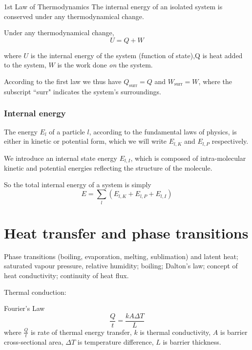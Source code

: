 \begin{thrm}{1st Law of Thermodynamics}{}
The internal energy of an isolated system is conserved under any thermodynamical change.

Under any thermodynamical change,
\begin{equation}
U = Q + W
\end{equation}
\end{thrm}

where $U$ is the internal energy of the system (function of state),$ $Q is heat added to the system, $W$ is the work done \emph{on} the system.

According to the first law we thus have $Q_\text{surr} = Q$ and $W_\text{surr} = W$, where the subscript ``surr" indicates the system’s surroundings.

\subsection{Internal energy}
The energy $E_l$ of a particle $l$, according to the fundamental laws of physics, is either in kinetic or potential form, which we will write $E_{l,K}$ and $E_{l,P}$ respectively. 

We introduce an internal state energy $E_{l,I}$, which is composed of intra-molecular kinetic and potential energies reflecting the structure of the molecule.

So the total internal energy of a system is simply
\[ E = \sum_l (E_{l,K} + E_{l,P} + E_{l,I}) \]

\pagebreak

\chapter{Heat transfer and phase transitions}
Phase transitions (boiling, evaporation, melting, sublimation) and latent heat; saturated vapour pressure, relative humidity; boiling; Dalton’s law; concept of heat conductivity; continuity of heat flux.

Thermal conduction:
\begin{thrm}{Fourier's Law}{}
\begin{equation}
{\frac{Q}{t} = \frac{kA\Delta T}{L}
}\end{equation}
where $\frac{Q}{t}$ is rate of thermal energy transfer, $k$ is thermal conductivity, $A$ is barrier cross-sectional area, $\Delta T$ is temperature difference, $L$ is barrier thickness.
\end{thrm}
\pagebreak

